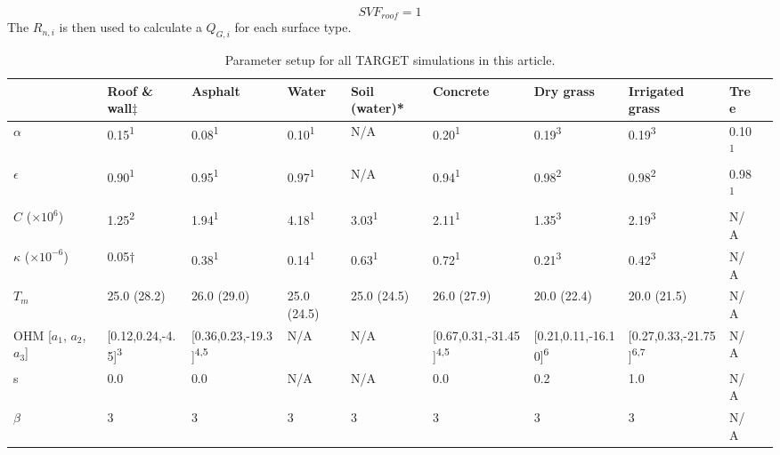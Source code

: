 \documentclass[gmd, manuscript]{copernicus}
\begin{document}
\begin{equation}
SVF_{roof} = 1
\end{equation} The $R_{n,i}$ is then used to calculate a \ensuremath{Q_{G,i}} for each surface type.

\begin{table}
\begin{center}

\caption{Parameter setup for all TARGET simulations in this article.}  
\label{tab:Parameter}
  \begin{tabular}{  p{2.5cm} p{1.3cm} p{1.3cm} p{1.3cm} p{1.3cm} p{1.3cm} p{1.3cm} p{1.3cm} p{1.3cm} p{1.3cm}} 
	\hline  \textbf{ } & \textbf{Roof \& wall$\ddagger$} & \textbf{Asphalt}& \textbf{Water}& \textbf{Soil 
	(water)*}& \textbf{Concrete}& \textbf{Dry grass}& \textbf{Irrigated grass} & \textbf{Tree} \\ 	
\hline	
\ensuremath{\alpha}                             & 0.15\textsuperscript{1}         & 0.08\textsuperscript{1}  & 0.10\textsuperscript{1}  & N/A   & 0.20\textsuperscript{1} & 0.19\textsuperscript{3} & 0.19\textsuperscript{3} & 0.10\textsuperscript{1} \\
\ensuremath{\epsilon}                        & 0.90\textsuperscript{1}        & 0.95\textsuperscript{1}  & 0.97\textsuperscript{1}  & N/A   & 0.94\textsuperscript{1} & 0.98\textsuperscript{2} & 0.98\textsuperscript{2} & 0.98\textsuperscript{1} \\ 
$C$  ($\times10^{6}$)                    & 1.25\textsuperscript{2}         & 1.94\textsuperscript{1}  & 4.18\textsuperscript{1}  & 3.03\textsuperscript{1}  & 2.11\textsuperscript{1} & 1.35\textsuperscript{3} & 2.19\textsuperscript{3} & N/A  \\ 
\ensuremath{\kappa}   ($\times10^{-6}$)                & 0.05$\dagger$& 0.38\textsuperscript{1}  &0.14\textsuperscript{1}   & 0.63\textsuperscript{1}  & 0.72\textsuperscript{1} & 0.21\textsuperscript{3} & 0.42\textsuperscript{3} & N/A  \\ 	
\ensuremath{T_{m}} &25.0  (28.2) & 26.0  (29.0)&25.0 (24.5)&25.0  (24.5)&26.0 (27.9)&20.0  (22.4)&20.0 (21.5) & N/A  \\ 
OHM [\ensuremath{a_{1}}, \ensuremath{a_{2}}, \ensuremath{a_{3}}]&[0.12,0.24,-4.5]\textsuperscript{3}&[0.36,0.23,-19.3]\textsuperscript{4,5}&N/A &N/A&[0.67,0.31,-31.45]\textsuperscript{4,5}&[0.21,0.11,-16.10]\textsuperscript{6}&[0.27,0.33,-21.75]\textsuperscript{6,7} & N/A \\ 
s &0.0&0.0&N/A&N/A&0.0&0.2&1.0&N/A \\ 
\ensuremath{\beta}&3&3&3&3&3&3&3&N/A \\ 



\end{tabular}
\end{center}
\end{table}
\end{document}
